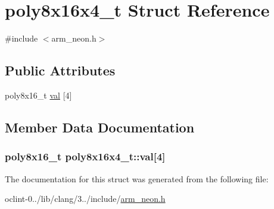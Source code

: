 \hypertarget{structpoly8x16x4__t}{\section{poly8x16x4\-\_\-t Struct Reference}
\label{structpoly8x16x4__t}
}


{\ttfamily \#include $<$arm\-\_\-neon.\-h$>$}

\subsection*{Public Attributes}
\begin{DoxyCompactItemize}
\item 
poly8x16\-\_\-t \hyperlink{structpoly8x16x4__t_a2d90838b70bc3beea56561bcb305c752}{val} \mbox{[}4\mbox{]}
\end{DoxyCompactItemize}


\subsection{Member Data Documentation}
\hypertarget{structpoly8x16x4__t_a2d90838b70bc3beea56561bcb305c752}{
\subsubsection[{val}]{\setlength{\rightskip}{0pt plus 5cm}poly8x16\-\_\-t poly8x16x4\-\_\-t\-::val\mbox{[}4\mbox{]}}}\label{structpoly8x16x4__t_a2d90838b70bc3beea56561bcb305c752}


The documentation for this struct was generated from the following file\-:\begin{DoxyCompactItemize}
\item 
oclint-\/0../lib/clang/3../include/\hyperlink{arm__neon_8h}{arm\-\_\-neon.\-h}\end{DoxyCompactItemize}
